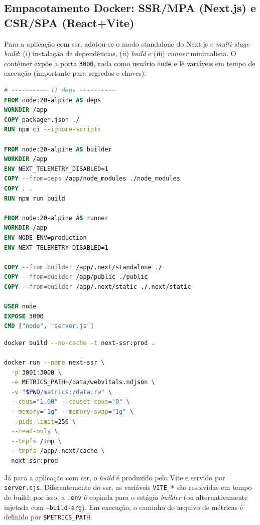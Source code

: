 \subsection{Empacotamento Docker: SSR/MPA (Next.js) e CSR/SPA (React+Vite)}
\label{ssec:docker-packaging}

Para a aplicação com \acrshort{ssr}, adotou-se o modo standalone do Next.js e \textit{multi-stage build}: (i) instalação de dependências, (ii) \textit{build} e (iii) \textit{runner} minimalista. O contêiner expõe a porta \texttt{3000}, roda como usuário \texttt{node} e lê variáveis em tempo de execução (importante para segredos e chaves).

\begin{lstlisting}[language=Dockerfile,caption={Dockerfile da aplicação SSR/MPA (Next.js)}]
# ---------- 1) deps ----------
FROM node:20-alpine AS deps
WORKDIR /app
COPY package*.json ./
RUN npm ci --ignore-scripts

FROM node:20-alpine AS builder
WORKDIR /app
ENV NEXT_TELEMETRY_DISABLED=1
COPY --from=deps /app/node_modules ./node_modules
COPY . .
RUN npm run build

FROM node:20-alpine AS runner
WORKDIR /app
ENV NODE_ENV=production
ENV NEXT_TELEMETRY_DISABLED=1

COPY --from=builder /app/.next/standalone ./
COPY --from=builder /app/public ./public
COPY --from=builder /app/.next/static ./.next/static

USER node
EXPOSE 3000
CMD ["node", "server.js"]
\end{lstlisting}

\begin{lstlisting}[language=bash,caption={Build e execução do container SSR com limites e volume de métricas}]
docker build --no-cache -t next-ssr:prod .

docker run --name next-ssr \
  -p 3001:3000 \
  -e METRICS_PATH=/data/webvitals.ndjson \
  -v "$PWD/metrics:/data:rw" \
  --cpus="1.00" --cpuset-cpus="0" \
  --memory="1g" --memory-swap="1g" \
  --pids-limit=256 \
  --read-only \
  --tmpfs /tmp \
  --tmpfs /app/.next/cache \
  next-ssr:prod
\end{lstlisting}

Já para a aplicação com \acrshort{csr}, o \textit{build} é produzido pelo Vite e servido por \texttt{server.cjs}. Diferentemente do \acrshort{ssr}, as variáveis \texttt{VITE\_*} são resolvidas em tempo de build; por isso, a \texttt{.env} é copiada para o estágio \textit{builder} (ou alternativamente injetada com \texttt{--build-arg}). Em execução, o caminho do arquivo de métricas é definido por \texttt{\$METRICS\_PATH}.

